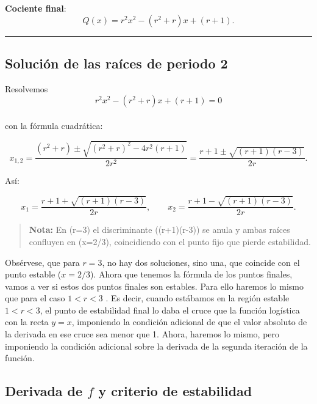 \documentclass[
  10pt,
  a4paper,
  DIV=11,
  numbers=noendperiod,
  open=any]{scrreprt}
\numberwithin{equation}{chapter}
\numberwithin{equation}{chapter}
\renewcommand{\[}{\begin{equation}}
\renewcommand{\]}{\end{equation}}
\begin{document}
\textbf{Cociente final}:\\
\[
Q(x) = r^2x^2 - (r^2+r)x + (r+1).
\]

\begin{center}\rule{0.5\linewidth}{0.5pt}\end{center}

\subsection{Solución de las raíces de periodo
2}\label{soluciuxf3n-de-las-rauxedces-de-periodo-2}

Resolvemos\\
\[
r^2x^2 - (r^2+r)x + (r+1) = 0
\]\\
con la fórmula cuadrática:

\begin{equation}

x_{1,2}
= \frac{(r^2+r)\pm\sqrt{(r^2+r)^2 - 4r^2(r+1)}}{2r^2}
= \frac{r+1\pm\sqrt{(r+1)(r-3)}}{2r}.

\end{equation}

Así:

\begin{equation}

x_1 = \frac{r+1 + \sqrt{(r+1)(r-3)}}{2r},
\qquad
x_2 = \frac{r+1 - \sqrt{(r+1)(r-3)}}{2r}.

\end{equation}

\begin{quote}
\textbf{Nota:} En (r=3) el discriminante ((r+1)(r-3)) se anula y ambas
raíces confluyen en (x=2/3), coincidiendo con el punto fijo que pierde
estabilidad.
\end{quote}

Obsérvese, que para \(r=3\), no hay dos soluciones, sino una, que
coincide con el punto estable (\(x=2/3\)). Ahora que tenemos la fórmula
de los puntos finales, vamos a ver si estos dos puntos finales son
estables. Para ello haremos lo mismo que para el caso \(1<r<3\) . Es
decir, cuando estábamos en la región estable \(1<r<3\), el punto de
estabilidad final lo daba el cruce que la función logística con la recta
\(y=x\), imponiendo la condición adicional de que el valor absoluto de
la derivada en ese cruce sea menor que 1. Ahora, haremos lo mismo, pero
imponiendo la condición adicional sobre la derivada de la segunda
iteración de la función.

\subsection{\texorpdfstring{Derivada de \(f\) y criterio de
estabilidad}{Derivada de f y criterio de estabilidad}}\label{derivada-de-f-y-criterio-de-estabilidad}
\end{document}
